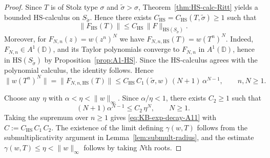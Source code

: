\documentclass[11pt]{amsart}
\numberwithin{equation}{section}
\newtheorem{remark}[theorem]{Remark}
\theoremstyle{definition}
\theoremstyle{plain}
\def\D{\mathbb{D}}
\newcommand{\HS}{\mathrm{HS}}
\begin{document}
\begin{proof}
Since $T$ is of Stolz type $\sigma$ and $\widetilde\sigma>\sigma$,
Theorem~\ref{thm:HS-calc-Ritt} yields a bounded \(\HS\)-calculus on
$S_{\widetilde\sigma}$. Hence there exists
$C_{\mathrm{HS}}=C_{\mathrm{HS}}(T,\widetilde\sigma)\ge1$ such that
\[
   \|F_{\HS}(T)\|\le C_{\mathrm{HS}}\,\|F\|_{\HS(S_{\widetilde\sigma})}.
\]
Moreover, for $F_{N,n}(z)=w(z^n)^N$ we have
$F_{N,n,\HS}(T)=w(T^n)^N$. Indeed, $F_{N,n}\in A^1(\D)$, and its Taylor
polynomials converge to $F_{N,n}$ in $A^1(\D)$, hence in
$\HS(S_{\widetilde\sigma})$ by Proposition~\ref{prop:A1-HS}. Since the
$\HS$-calculus agrees with the polynomial calculus, the identity follows.
Hence
\[
   \|w(T^n)^N\|
   =\|F_{N,n,\HS}(T)\|
   \le C_{\mathrm{HS}}\,C_1(\widetilde\sigma,w)\,(N+1)\,\alpha^{N-1}, 
   \qquad n,N\ge1.
\]

Choose any $\eta$ with $\alpha<\eta<\|w\|_\infty$.
Since $\alpha/\eta<1$, there exists $C_2\ge1$ such that
\[
   (N+1)\alpha^{N-1}\le C_2\,\eta^N, \qquad N\ge1.
\]
Taking the supremum over $n\ge1$ gives \eqref{eq:KB-exp-decay-A11} with
$C:=C_{\mathrm{HS}}\,C_1\,C_2$.  The existence of the limit defining
$\gamma(w,T)$ follows from the submultiplicativity argument in
Lemma~\ref{lem:submult-radius}, and the estimate
$\gamma(w,T)\le \eta<\|w\|_\infty$ follows by taking $N$th roots.
\end{proof}




\end{document}
